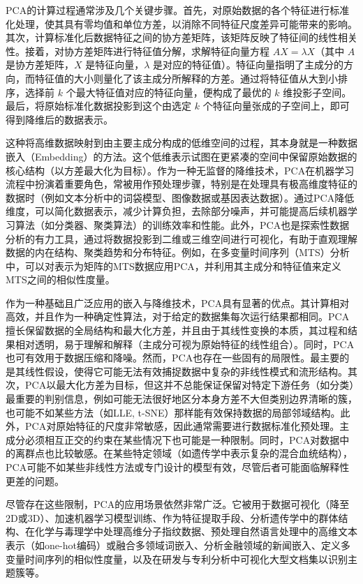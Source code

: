 PCA的计算过程通常涉及几个关键步骤。首先，对原始数据的各个特征进行标准化处理，使其具有零均值和单位方差，以消除不同特征尺度差异可能带来的影响。其次，计算标准化后数据特征之间的协方差矩阵，该矩阵反映了特征间的线性相关性。接着，对协方差矩阵进行特征值分解，求解特征向量方程 $AX=\lambda X$（其中 $A$ 是协方差矩阵，$X$ 是特征向量，$\lambda$ 是对应的特征值）。特征向量指明了主成分的方向，而特征值的大小则量化了该主成分所解释的方差。通过将特征值从大到小排序，选择前 $k$ 个最大特征值对应的特征向量，便构成了最优的 $k$ 维投影子空间。最后，将原始标准化数据投影到这个由选定 $k$ 个特征向量张成的子空间上，即可得到降维后的数据表示。

这种将高维数据映射到由主要主成分构成的低维空间的过程，其本身就是一种数据嵌入（Embedding）的方法。这个低维表示试图在更紧凑的空间中保留原始数据的核心结构（以方差最大化为目标）。作为一种无监督的降维技术，PCA在机器学习流程中扮演着重要角色，常被用作预处理步骤，特别是在处理具有极高维度特征的数据时（例如文本分析中的词袋模型、图像数据或基因表达数据）。通过PCA降低维度，可以简化数据表示，减少计算负担，去除部分噪声，并可能提高后续机器学习算法（如分类器、聚类算法）的训练效率和性能。此外，PCA也是探索性数据分析的有力工具，通过将数据投影到二维或三维空间进行可视化，有助于直观理解数据的内在结构、聚类趋势和分布特征。例如，在多变量时间序列（MTS）分析中，可以对表示为矩阵的MTS数据应用PCA，并利用其主成分和特征值来定义MTS之间的相似性度量。

作为一种基础且广泛应用的嵌入与降维技术，PCA具有显著的优点。其计算相对高效，并且作为一种确定性算法，对于给定的数据集每次运行结果都相同。PCA擅长保留数据的全局结构和最大化方差，并且由于其线性变换的本质，其过程和结果相对透明，易于理解和解释（主成分可视为原始特征的线性组合）。同时，PCA也可有效用于数据压缩和降噪。然而，PCA也存在一些固有的局限性。最主要的是其线性假设，使得它可能无法有效捕捉数据中复杂的非线性模式和流形结构。其次，PCA以最大化方差为目标，但这并不总能保证保留对特定下游任务（如分类）最重要的判别信息，例如可能无法很好地区分本身方差不大但类别边界清晰的簇，也可能不如某些方法（如LLE, t-SNE）那样能有效保持数据的局部邻域结构。此外，PCA对原始特征的尺度非常敏感，因此通常需要进行数据标准化预处理。主成分必须相互正交的约束在某些情况下也可能是一种限制。同时，PCA对数据中的离群点也比较敏感。在某些特定领域（如遗传学中表示复杂的混合血统结构），PCA可能不如某些非线性方法或专门设计的模型有效，尽管后者可能面临解释性更差的问题。

尽管存在这些限制，PCA的应用场景依然非常广泛。它被用于数据可视化（降至2D或3D）、加速机器学习模型训练、作为特征提取手段、分析遗传学中的群体结构、在化学与毒理学中处理高维分子指纹数据、预处理自然语言处理中的高维文本表示（如one-hot编码）或融合多领域词嵌入、分析金融领域的新闻嵌入、定义多变量时间序列的相似性度量，以及在研发与专利分析中可视化大型文档集以识别主题簇等。

